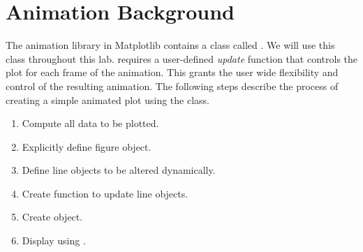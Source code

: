 \begin{comment} 
As mentioned in the Introduction to Matplotlib lab in Volume 1, 3D plots and animations are useful in visualizing solutions to ODEs and PDEs found in many dynamics and control problems.
This lab covers basics for 3D plotting, animating 2D plots, and animating 3D trajectories and 3D surfaces. 

In Matplotlib, plots are created using figure objects.
It is possible to create a plot without explicitily instantiating the figure object, but creating an instance separately allows for useful functions to be called on that object. Initializing a figure object is done using the following code:

\begin{lstlisting}
>>> fig = plt.figure()
\end{lstlisting}

3D plotting and animation both require the figure object to be created explicitly. 
\end{comment}
\begin{comment}
\begin{info}
There are different options for plotting in Jupyter Notebook.
In the past we have used \li{\%matplotlib inline}.
For labs with animation we will use \li{\%matplotlib notebook} instead.
This is an interactive regime that allows animations to be displayed without creating a new window.
\end{info}
\end{comment}

\section*{Animation Background}
The animation library in Matplotlib contains a class called .
We will use this class throughout this lab.  requires a user-defined \textit{update} function that controls the plot for each frame of the animation. 
This grants the user wide flexibility and control of the resulting animation.
The following steps describe the process of creating a simple animated plot using the  class. 
\begin{enumerate}
\item Compute all data to be plotted.
\item Explicitly define figure object.
\item Define line objects to be altered dynamically.
\item Create function to update line objects.
\item Create  object.
\item Display using .
\end{enumerate}

